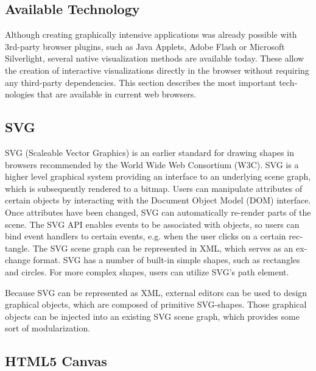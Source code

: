 \begin{english}
\section{Available Technology} %

Although creating graphically intensive applications was already possible with 3rd-party browser plugins, such as Java Applets, Adobe Flash or Microsoft Silverlight, several native visualization methods are available today. These allow the creation of interactive visualizations directly in the browser without requiring any third-party dependencies. This section describes the most important technologies that are available in current web browsers.

\subsection{SVG}

SVG (Scaleable Vector Graphics) is an earlier standard for drawing shapes in browsers recommended by the World Wide Web Consortium (W3C). SVG is a higher level graphical system providing an interface to an underlying scene graph, which is subsequently rendered to a bitmap. Users can manipulate attributes of certain objects by interacting with the Document Object Model (DOM) interface. Once attributes have been changed, SVG can automatically re-render parts of the scene. The SVG API enables events to be associated with objects, so users can bind event handlers to certain events, e.g. when the user clicks on a certain rectangle. The SVG scene graph can be represented in XML, which serves as an exchange format. SVG has a number of built-in simple shapes, such as rectangles and circles. For more complex shapes, users can utilize SVG's path element.

Because SVG can be represented as XML, external editors can be used to design graphical objects, which are composed of primitive SVG-shapes. Those graphical objects can be injected into an existing SVG scene graph, which provides some sort of modularization.

\subsection{HTML5 Canvas}


\end{english}
